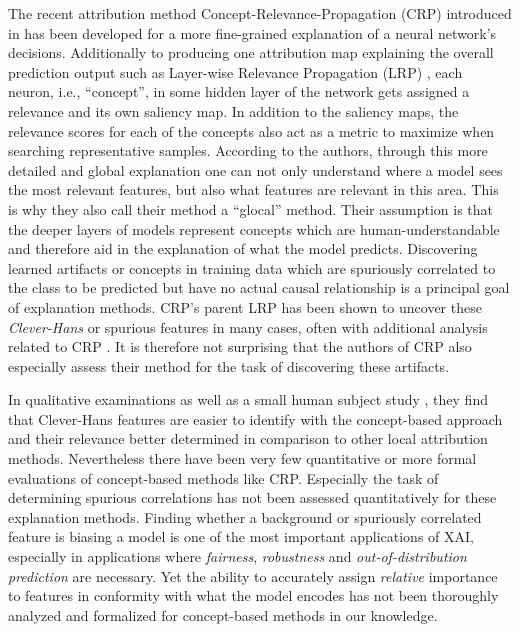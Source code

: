 The recent attribution method Concept-Relevance-Propagation (CRP) introduced in \cite{Achtibat2022} has been developed for a more fine-grained explanation of a neural network's decisions. Additionally to producing one attribution map explaining the overall prediction output such as Layer-wise Relevance Propagation (LRP) \citep{Bach2015}, each neuron, i.e., ``concept'', in some hidden layer of the network gets assigned a relevance and its own saliency map. In addition to the saliency maps, the relevance scores for each of the concepts also act as a metric to maximize when searching representative samples. According to the authors, through this more detailed and global explanation one can not only understand where a model sees the most relevant features, but also what features are relevant in this area. This is why they also call their method a ``glocal'' method. Their assumption is that the deeper layers of models represent concepts which are human-understandable and therefore aid in the explanation of what the model predicts. Discovering learned artifacts or concepts in training data which are spuriously correlated to the class to be predicted but have no actual causal relationship is a principal goal of explanation methods. CRP's parent LRP has been shown to uncover these \textit{Clever-Hans} or spurious features in many cases, often with additional analysis related to CRP \citep{Lapuschkin2019, Anders2022}. It is therefore not surprising that the authors of CRP also especially assess their method for the task of discovering these artifacts. 

In qualitative examinations as well as a small human subject study \citep{Achtibat2023}, they find that Clever-Hans features are easier to identify with the concept-based approach and their relevance better determined in comparison to other local attribution methods. Nevertheless there have been very few quantitative or more formal evaluations of concept-based methods like CRP.
Especially the task of determining spurious correlations has not been assessed quantitatively for these explanation methods. 
Finding whether a background or spuriously correlated feature is biasing a model is one of the most important applications of XAI, especially in applications where \textit{fairness}, \textit{robustness} and \textit{out-of-distribution prediction} are necessary. Yet the ability to accurately assign \textit{relative} importance to features in conformity with what the model encodes has not been thoroughly analyzed and formalized for concept-based methods in our knowledge. 

